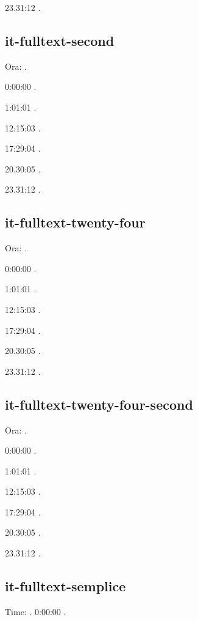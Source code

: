 \documentclass[italian,english]{article}
\begin{document}
23.31:12   .
\subsection{it-fulltext-second}
Ora: \DTMcurrenttime.

0:00:00  .

1:01:01   . 

12:15:03   . 

17:29:04   . 

20.30:05   .

23.31:12   .
\subsection{it-fulltext-twenty-four}
Ora: \DTMcurrenttime.

0:00:00  .

1:01:01   . 

12:15:03   . 

17:29:04   . 

20.30:05   .

23.31:12   .
\subsection{it-fulltext-twenty-four-second}
Ora: \DTMcurrenttime.

0:00:00  .

1:01:01   . 

12:15:03   . 

17:29:04   . 

20.30:05   .

23.31:12   .

\subsection{it-fulltext-semplice}
Time: \DTMcurrenttime.
0:00:00  .
\end{document}
